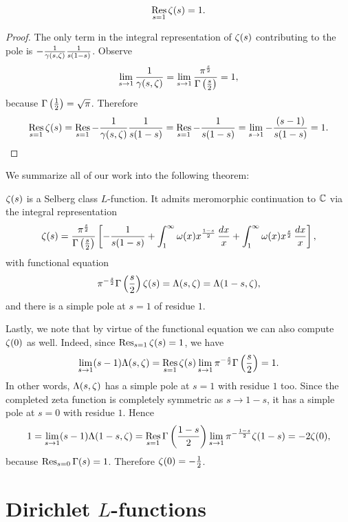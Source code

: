       \begin{proposition}\label{prop:zeta_residue}
        \[
          \operatorname*{\mathrm{Res}}_{s = 1}\zeta(s) = 1.
        \]
      \end{proposition}
      \begin{proof}
        The only term in the integral representation of $\zeta(s)$ contributing to the pole is $-\frac{1}{\gamma(s,\zeta)}\frac{1}{s(1-s)}$. Observe
        \[
          \lim_{s \to 1}\frac{1}{\gamma(s,\zeta)} = \lim_{s \to 1}\frac{\pi^{\frac{s}{2}}}{\Gamma\left(\frac{s}{2}\right)} = 1,
        \]
        because $\Gamma\left(\frac{1}{2}\right) = \sqrt{\pi}$. Therefore
        \[
          \operatorname*{\mathrm{Res}}_{s = 1}\zeta(s) = \operatorname*{\mathrm{Res}}_{s = 1}-\frac{1}{\gamma(s,\zeta)}\frac{1}{s(1-s)} = \operatorname*{\mathrm{Res}}_{s = 1}-\frac{1}{s(1-s)} = \lim_{s \to 1}-\frac{(s-1)}{s(1-s)} = 1.
        \]
      \end{proof}

      We summarize all of our work into the following theorem:

      \begin{theorem}
        $\zeta(s)$ is a Selberg class $L$-function. It admits meromorphic continuation to $\mathbb{C}$ via the integral representation
        \[
          \zeta(s) = \frac{\pi^{\frac{s}{2}}}{\Gamma\left(\frac{s}{2}\right)}\left[-\frac{1}{s(1-s)}+\int_{1}^{\infty}\omega(x)x^{\frac{1-s}{2}}\,\frac{dx}{x}+\int_{1}^{\infty}\omega(x)x^{\frac{s}{2}}\,\frac{dx}{x}\right],
        \]
        with functional equation
        \[
          \pi^{-\frac{s}{2}}\Gamma\left(\frac{s}{2}\right)\zeta(s) = \Lambda(s,\zeta) = \Lambda(1-s,\zeta),
        \]
        and there is a simple pole at $s = 1$ of residue $1$.
      \end{theorem}

      Lastly, we note that by virtue of the functional equation we can also compute $\zeta(0)$ as well. Indeed, since $\operatorname*{\mathrm{Res}}_{s = 1}\zeta(s) = 1$, we have
        \[
          \lim_{s \to 1}(s-1)\Lambda(s,\zeta) = \operatorname*{\mathrm{Res}}_{s = 1}\zeta(s)\lim_{s \to 1}\pi^{-\frac{s}{2}}\Gamma\left(\frac{s}{2}\right) = 1.
        \]
        In other words, $\Lambda(s,\zeta)$ has a simple pole at $s = 1$ with residue $1$ too. Since the completed zeta function is completely symmetric as $s \to 1-s$, it has a simple pole at $s = 0$ with residue $1$. Hence
        \[
          1 = \lim_{s \to 1}(s-1)\Lambda(1-s,\zeta) = \operatorname*{\mathrm{Res}}_{s = 1}\Gamma\left(\frac{1-s}{2}\right)\lim_{s \to 1}\pi^{-\frac{1-s}{2}}\zeta(1-s) = -2\zeta(0),
        \]
        because $\operatorname*{\mathrm{Res}}_{s = 0}\Gamma(s) = 1$. Therefore $\zeta(0) = -\frac{1}{2}$.
  \section{Dirichlet \texorpdfstring{$L$}{L}-functions}
